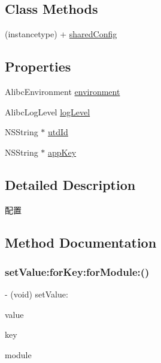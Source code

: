 \subsection*{Class Methods}
\begin{DoxyCompactItemize}
\item 
(instancetype) + \mbox{\hyperlink{interface_alibc_config_a16182428d86003b3cbc5e33312a53adf}{shared\+Config}}
\end{DoxyCompactItemize}
\subsection*{Properties}
\begin{DoxyCompactItemize}
\item 
Alibc\+Environment \mbox{\hyperlink{interface_alibc_config_a6305a137406382c000ce05a885c455a3}{environment}}
\item 
Alibc\+Log\+Level \mbox{\hyperlink{interface_alibc_config_a9e05474300a7a3b8103946ca2a40937c}{log\+Level}}
\item 
N\+S\+String $\ast$ \mbox{\hyperlink{interface_alibc_config_a1fb8c04c3b4b902371a38994e3ca47ad}{utd\+Id}}
\item 
N\+S\+String $\ast$ \mbox{\hyperlink{interface_alibc_config_ab88b65de1b1b16fead01e5c2a5a0589e}{app\+Key}}
\end{DoxyCompactItemize}


\subsection{Detailed Description}
配置 

\subsection{Method Documentation}
\mbox{\label{interface_alibc_config_af5522575592d86272ad54740e0135464}} 
\subsubsection{\texorpdfstring{set\+Value\+:for\+Key\+:for\+Module\+:()}{setValue:forKey:forModule:()}}
{\footnotesize\ttfamily -\/ (void) set\+Value\+: \begin{DoxyParamCaption}\item[{(nullable id)}]{value }\item[{forKey:(N\+S\+String $\ast$)}]{key }\item[{forModule:(N\+S\+String $\ast$)}]{module }\end{DoxyParamCaption}}

